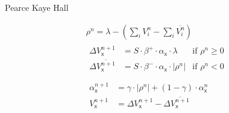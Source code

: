 \documentclass[border=10pt,varwidth]{standalone}
\begin{document}
\newcommand{\eks}{\textsf{x}}
\begin{center}
	\huge
	\sffamily
	Pearce Kaye Hall
\end{center}
\begin{equation*}
	\begin{gathered}
		\rho^n = \lambda - \left( \textstyle\sum_i V_i^n - \textstyle\sum_i \overline{V_i^n} \right) \\[1ex]
		\begin{aligned}
			\Delta V_\eks^{n + 1}            &= S \cdot \beta^+ \cdot \alpha_\eks \cdot \lambda             & \text{if } \rho^n \geq 0 \\
			\Delta \overline{V_\eks^{n + 1}} &= S \cdot \beta^- \cdot \alpha_\eks \cdot \left| \rho^n \right| & \text{if } \rho^n < 0 \\
		\end{aligned} \\[1ex]
		\begin{aligned}
			\alpha_\eks^{n + 1} &= \gamma \cdot \left| \rho^n \right| + (1 - \gamma) \cdot \alpha_\eks^n \\
			V_\eks^{n + 1} &= \Delta V_\eks^{n + 1} - \Delta \overline{V_\eks^{n + 1}}
		\end{aligned}
	\end{gathered}
\end{equation*}
\end{document}
